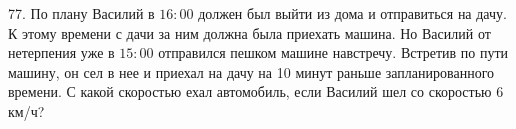 77. По плану Василий в $16:00$ должен был выйти из дома и отправиться на дачу. К этому времени с дачи за ним должна была приехать машина. Но Василий от нетерпения уже в $15:00$ отправился пешком машине навстречу. Встретив по пути машину, он сел в нее и приехал на дачу на 10 минут раньше запланированного времени. С какой скоростью ехал автомобиль, если Василий шел со скоростью 6 км/ч?\\
